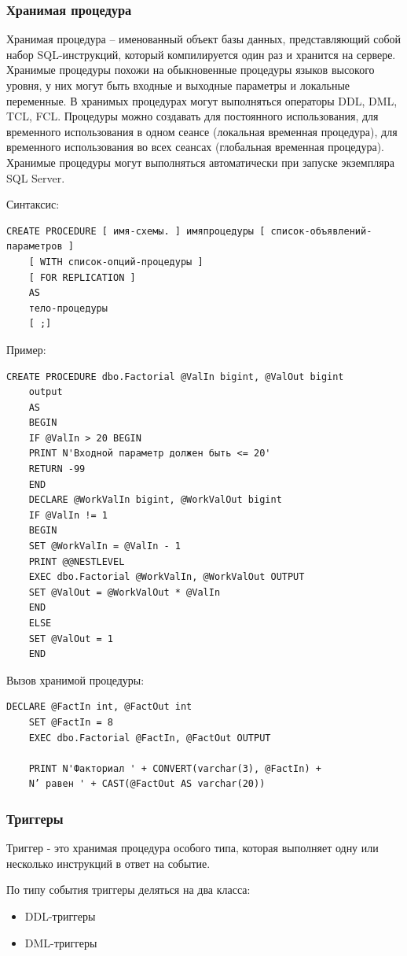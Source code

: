 \subsubsection{Хранимая процедура}

Хранимая процедура – именованный объект базы данных, представляющий собой набор
SQL-инструкций, который компилируется один раз и хранится на сервере. Хранимые
процедуры похожи на обыкновенные процедуры языков высокого уровня, у них могут быть
входные и выходные параметры и локальные переменные. В хранимых процедурах могут
выполняться операторы DDL, DML, TCL, FCL. Процедуры можно создавать для постоянного
использования, для временного использования в одном сеансе (локальная временная
процедура), для временного использования во всех сеансах (глобальная временная процедура). Хранимые процедуры могут выполняться автоматически при запуске экземпляра
SQL Server.

Синтаксис:
\begin{lstlisting}[label=procsint]
	CREATE PROCEDURE [ имя-схемы. ] имяпроцедуры [ список-объявлений-параметров ]
	[ WITH список-опций-процедуры ]
	[ FOR REPLICATION ]
	AS
	тело-процедуры
	[ ;] 
\end{lstlisting}
Пример:
\begin{lstlisting}[label=procexample]
	CREATE PROCEDURE dbo.Factorial @ValIn bigint, @ValOut bigint
	output
	AS
	BEGIN
	IF @ValIn > 20 BEGIN
	PRINT N'Входной параметр должен быть <= 20'
	RETURN -99
	END
	DECLARE @WorkValIn bigint, @WorkValOut bigint
	IF @ValIn != 1
	BEGIN
	SET @WorkValIn = @ValIn - 1
	PRINT @@NESTLEVEL
	EXEC dbo.Factorial @WorkValIn, @WorkValOut OUTPUT
	SET @ValOut = @WorkValOut * @ValIn
	END
	ELSE
	SET @ValOut = 1
	END 
\end{lstlisting}
Вызов хранимой процедуры:
\begin{lstlisting}[label=procexec]
	DECLARE @FactIn int, @FactOut int
	SET @FactIn = 8
	EXEC dbo.Factorial @FactIn, @FactOut OUTPUT
	
	PRINT N'Факториал ' + CONVERT(varchar(3), @FactIn) +
	N’ равен ' + CAST(@FactOut AS varchar(20))
\end{lstlisting}

\subsubsection{Триггеры}
Триггер - это хранимая процедура особого типа, которая выполняет одну или несколько
инструкций в ответ на событие.

По типу события триггеры деляться на два класса:
\begin{itemize}
	\item DDL-триггеры
	\item DML-триггеры
\end{itemize}

